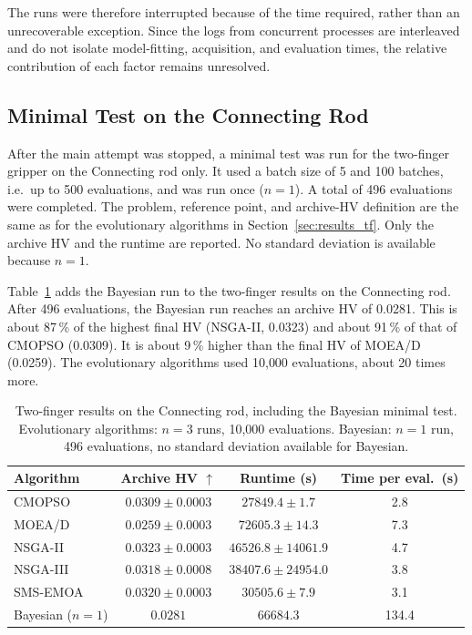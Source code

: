 The runs were therefore interrupted because of the time required, rather than an
unrecoverable exception. Since the logs from concurrent processes are
interleaved and do not isolate model-fitting, acquisition, and evaluation times,
the relative contribution of each factor remains unresolved.

\subsection{Minimal Test on the Connecting Rod}
\label{subsec:results_bayesian_minimal}

After the main attempt was stopped, a minimal test was run for the two-finger gripper on
the Connecting rod only. It used a batch size of 5 and 100 batches, i.e.\ up to 500
evaluations, and was run once ($n=1$). A total of 496 evaluations were completed. The
problem, reference point, and archive-HV definition are the same as for the evolutionary
algorithms in Section~\ref{sec:results_tf}. Only the archive HV and the runtime are
reported. No standard deviation is available because $n=1$.

Table~\ref{tab:pj_bayesian_connecting_rod} adds the Bayesian run to the two-finger results
on the Connecting rod. After 496 evaluations, the Bayesian run reaches an archive HV of
0.0281. This is about 87\,\% of the highest final HV (NSGA-II, 0.0323) and about 91\,\% of
that of CMOPSO (0.0309). It is about 9\,\% higher than the final HV of MOEA/D (0.0259).
The evolutionary algorithms used 10{,}000 evaluations, about 20 times more.

\begin{table}[htbp]
    \centering
    \caption{Two-finger results on the Connecting rod, including the Bayesian minimal test.
    Evolutionary algorithms: $n=3$ runs, 10{,}000 evaluations. Bayesian: $n=1$ run,
    496 evaluations, no standard deviation available for Bayesian.}
    \label{tab:pj_bayesian_connecting_rod}
    \begin{tabular}{@{}lccc@{}}
        \toprule
        \textbf{Algorithm} & \textbf{Archive HV} $\uparrow$ & \textbf{Runtime (s)} & \textbf{Time per eval.\ (s)} \\
        \midrule
        CMOPSO    & $0.0309 \pm 0.0003$ & $27849.4 \pm 1.7$ & 2.8 \\
        MOEA/D    & $0.0259 \pm 0.0003$ & $72605.3 \pm 14.3$ & 7.3 \\
        NSGA-II   & {\boldmath$0.0323 \pm 0.0003$} & $46526.8 \pm 14061.9$ & 4.7 \\
        NSGA-III  & $0.0318 \pm 0.0008$ & $38407.6 \pm 24954.0$ & 3.8 \\
        SMS-EMOA  & $0.0320 \pm 0.0003$ & $30505.6 \pm 7.9$ & 3.1 \\
        \midrule
        Bayesian ($n=1$) & $0.0281$ & $66684.3$ & 134.4 \\
        \bottomrule
    \end{tabular}
\end{table}

